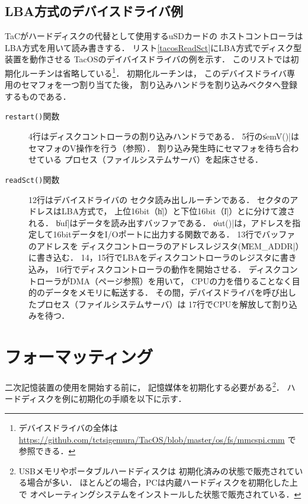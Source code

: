 \subsection{LBA方式のデバイスドライバ例}
TaCがハードディスクの代替として使用するuSDカードの
ホストコントローラはLBA方式を用いて読み書きする．
リスト\ref{tacosReadSct}にLBA方式でディスク型装置を動作させる
TacOSのデイバイスドライバの例を示す．
このリストでは初期化ルーチンは省略している\footnote{
デバイスドライバの全体は
\url{https://github.com/tctsigemura/TacOS/blob/master/os/fs/mmcspi.cmm}
で参照できる．}．
初期化ルーチンは，
このデバイスドライバ専用のセマフォを一つ割り当てた後，
割り込みハンドラを割り込みベクタへ登録するものである．



\begin{description}
\item[\texttt{restart()}関数]
  4行はディスクコントローラの割り込みハンドラである．
  5行の\|semV()|はセマフォのV操作を行う（参照）．
  割り込み発生時にセマフォを待ち合わせている
  プロセス（ファイルシステムサーバ）を起床させる．
\item[\texttt{readSct()}関数] 12行はデバイスドライバの
  セクタ読み出しルーチンである．
  セクタのアドレスはLBA方式で，
  上位16bit（\|h|）と下位16bit（\|l|）とに分けて渡される．
  \|buf|はデータを読み出すバッファである．
  \|out()|は，アドレスを指定して16bitデータをI/Oポートに出力する関数である．
  13行でバッファのアドレスを
  ディスクコントローラのアドレスレジスタ(\|MEM_ADDR|）に書き込む．
    14，15行でLBAをディスクコントローラのレジスタに書き込み，
    16行でディスクコントローラの動作を開始させる．
    ディスクコントローラがDMA（\pageref{dma}ページ参照）を用いて，
    CPUの力を借りることなく目的のデータをメモリに転送する．
    その間，デバイスドライバを呼び出したプロセス（ファイルシステムサーバ）は
    17行でCPUを解放して割り込みを待つ．
\end{description}

\section{フォーマッティング}
二次記憶装置の使用を開始する前に，
記憶媒体を初期化する必要がある\footnote{
USBメモリやポータブルハードディスクは
初期化済みの状態で販売されている場合が多い．
ほとんどの場合，PCは内蔵ハードディスクを初期化した上で
オペレーティングシステムをインストールした状態で販売されている．
}．
ハードディスクを例に初期化の手順を以下に示す．

